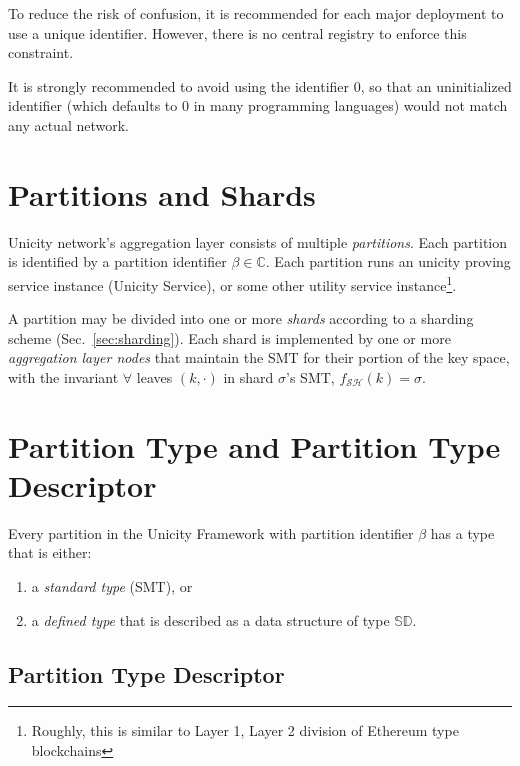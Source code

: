 To reduce the risk of confusion, it is recommended for each major deployment to use a unique identifier. However, there is no central registry to enforce this constraint.

It is strongly recommended to avoid using the identifier $0$, so that an uninitialized identifier (which defaults to $0$ in many programming languages) would not match any actual network.

\section{Partitions and Shards}

Unicity network's aggregation layer consists of multiple \emph{partitions}. Each partition is identified by a partition identifier $\beta \in \mathbb{C}$. Each partition runs an unicity proving service instance (Unicity Service), or some other utility service instance\footnote{Roughly, this is similar to Layer 1, Layer 2 division of Ethereum type blockchains}.

A partition may be divided into one or more \emph{shards} according to a sharding scheme (Sec.~\ref{sec:sharding}). Each shard is implemented by one or more \emph{aggregation layer nodes} that maintain the SMT for their portion of the key space, with the invariant $\forall$ leaves $(k,\cdot)$ in shard $\sigma$'s SMT, $f_\mathcal{SH}(k) = \sigma$.

\section{Partition Type and Partition Type Descriptor}

Every partition in the Unicity Framework with partition identifier $\beta$ has a type that is either:
\begin{enumerate}
\item a \emph{standard type} (SMT), or
\item a \emph{defined type} that is described as a data structure of type $\mathbb{SD}$.
\end{enumerate}

\subsection{Partition Type Descriptor}

